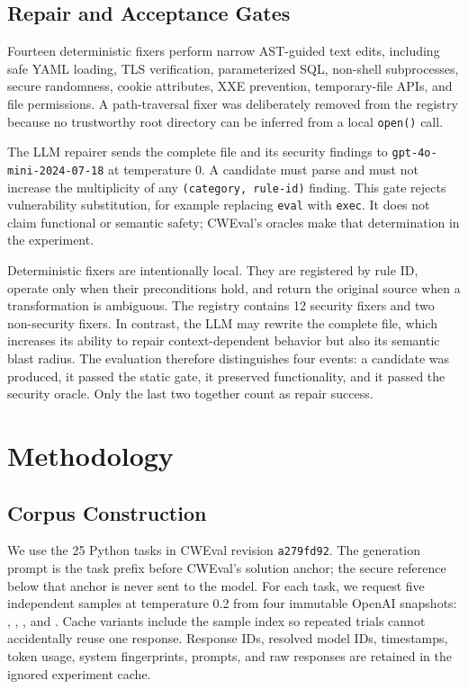 \documentclass[sigconf,nonacm]{acmart}
\begin{document}
\subsection{Repair and Acceptance Gates}

Fourteen deterministic fixers perform narrow AST-guided text edits, including
safe YAML loading, TLS verification, parameterized SQL, non-shell subprocesses,
secure randomness, cookie attributes, XXE prevention, temporary-file APIs, and
file permissions. A path-traversal fixer was deliberately removed from the
registry because no trustworthy root directory can be inferred from a local
\texttt{open()} call.

The LLM repairer sends the complete file and its security findings to
\texttt{gpt-4o-mini-2024-07-18} at temperature 0. A candidate must parse and
must not increase the multiplicity of any \texttt{(category, rule-id)} finding.
This gate rejects vulnerability substitution, for example replacing
\texttt{eval} with \texttt{exec}. It does not claim functional or semantic
safety; CWEval's oracles make that determination in the experiment.

Deterministic fixers are intentionally local. They are registered by rule ID,
operate only when their preconditions hold, and return the original source when
a transformation is ambiguous. The registry contains 12 security fixers and
two non-security fixers. In contrast, the LLM may rewrite the complete file,
which increases its ability to repair context-dependent behavior but also its
semantic blast radius. The evaluation therefore distinguishes four events: a
candidate was produced, it passed the static gate, it preserved functionality,
and it passed the security oracle. Only the last two together count as repair
success.

\section{Methodology}

\subsection{Corpus Construction}

We use the 25 Python tasks in CWEval revision \texttt{a279fd92}. The generation prompt is the
task prefix before CWEval's solution anchor; the secure reference below that
anchor is never sent to the model. For each task, we request five independent
samples at temperature 0.2 from four immutable OpenAI snapshots:
, ,
, and . Cache variants include the sample index so
repeated trials cannot accidentally reuse one response. Response IDs, resolved
model IDs, timestamps, token usage, system fingerprints, prompts, and raw
responses are retained in the ignored experiment cache.
\end{document}
